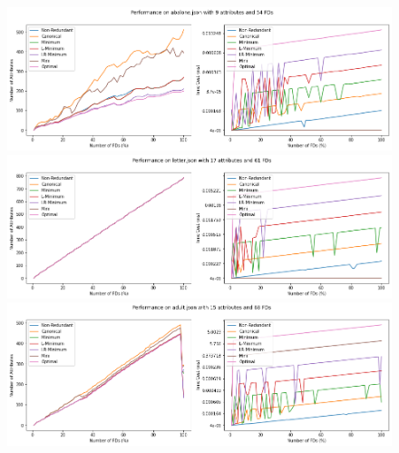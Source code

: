 \documentclass[11pt]{book}
\begin{document}
\begin{figure}
	\centering
	\includegraphics[width=\textwidth]{./diagrams/lab2/abalone.png}
	\includegraphics[width=\textwidth]{./diagrams/lab2/letter.png}
	\includegraphics[width=\textwidth]{./diagrams/lab2/adult.png}
\end{figure}
\end{document}
